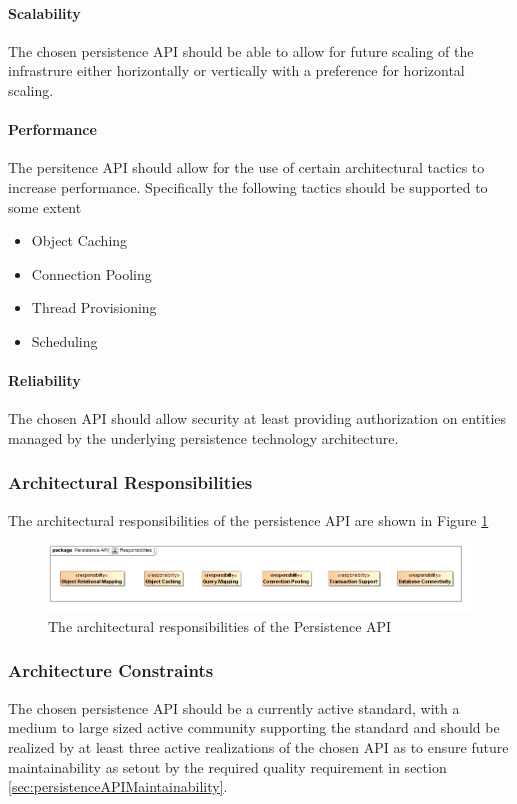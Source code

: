 \paragraph{Scalability}
The chosen persistence API should be able to allow for future scaling of the
infrastrure either horizontally or vertically with a preference for 
horizontal scaling.

\paragraph{Performance}
The persitence API should allow for the use of certain architectural tactics
to increase performance. Specifically the following tactics should be supported
to some extent
\begin{itemize}
	\item Object Caching
	\item Connection Pooling
	\item Thread Provisioning
	\item Scheduling
\end{itemize}

\paragraph{Reliability}
The chosen API should allow security at least providing authorization on
entities managed by the underlying persistence technology architecture.

\subsubsection{Architectural Responsibilities}
The architectural responsibilities of the persistence API are shown in 
Figure \ref{fig:persistenceResponsibilities}
\begin{figure}[H]
	\begin{center}
	\includegraphics[scale=0.5]{../Diagrams and Charts/Persistence API/Responsibilities.jpg}
	\caption{The architectural responsibilities of the Persistence API}
	\label{fig:persistenceResponsibilities}
	\end{center}
\end{figure}

\subsubsection{Architecture Constraints}
The chosen persistence API should be a currently active standard, with a medium
to large sized active community supporting the standard and should be realized
by at least three active realizations of the chosen API as to ensure future 
maintainability as setout by the required quality requirement in 
section \ref{sec:persistenceAPIMaintainability}.
\label{sec:persistenceAPIArchitecturalConstraints}

